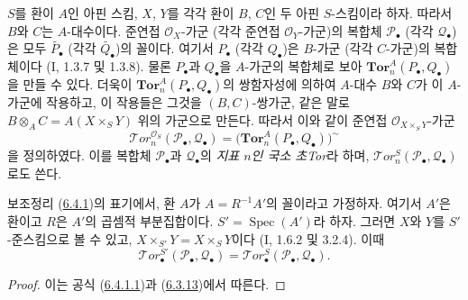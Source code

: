 \begin{env}[6.4.1]
\label{III.6.4.1-fr}
$S$를 환이 $A$인 아핀 스킴, $X$, $Y$를 각각 환이 $B$, $C$인 두
아핀 $S$-스킴이라 하자. 따라서 $B$와 $C$는 $A$-대수이다. 준연접
$\mathscr O_X$-가군 (각각 준연접 $\mathscr O_Y$-가군)의 복합체
$\mathscr P_\bullet$ (각각 $\mathscr Q_\bullet$)은 모두
$\widetilde{P_\bullet}$ (각각 $\widetilde{Q_\bullet}$)의 꼴이다. 여기서
$P_\bullet$ (각각 $Q_\bullet$)은 $B$-가군 (각각 $C$-가군)의 복합체이다
(I, 1.3.7 및 1.3.8). 물론 $P_\bullet$과 $Q_\bullet$을 $A$-가군의
복합체로 보아 $\mathbf{Tor}_n^A(P_\bullet,Q_\bullet)$을 만들 수 있다.
더욱이 $\mathbf{Tor}_n^A(P_\bullet,Q_\bullet)$의 쌍함자성에 의하여
$A$-대수 $B$와 $C$가 이 $A$-가군에 작용하고, 이 작용들은 그것을
$(B,C)$-쌍가군, 같은 말로 $B\otimes_A C=A(X\times_S Y)$ 위의 가군으로
만든다. 따라서 이와 같이 준연접 $\mathscr O_{X\times_S Y}$-가군
\[
  \mathscr{T}\!or_n^{\mathscr O_S}(\mathscr P_\bullet,\mathscr Q_\bullet)
  =\bigl(\mathbf{Tor}_n^A(P_\bullet,Q_\bullet)\bigr)^{\sim}
  \tag{6.4.1.1}\label{III.6.4.1.1.fr}
\]
을 정의하였다. 이를 복합체 $\mathscr P_\bullet$과
$\mathscr Q_\bullet$의 \emph{지표 $n$인 국소 초Tor}라 하며,
$\mathscr{T}\!or_n^S(\mathscr P_\bullet,\mathscr Q_\bullet)$로도 쓴다.
\end{env}

\begin{namedtheorem}[6.4.2]{보조정리}
\label{III.6.4.2-fr}
(\hyperref[III.6.4.1-fr]{6.4.1})의 표기에서, 환 $A$가
$A=R^{-1}A'$의 꼴이라고 가정하자. 여기서 $A'$은 환이고 $R$은
$A'$의 곱셈적 부분집합이다. $S'=\operatorname{Spec}(A')$라 하자.
그러면 $X$와 $Y$를 $S'$-준스킴으로 볼 수 있고,
$X\times_{S'}Y=X\times_S Y$이다 (I, 1.6.2 및 3.2.4). 이때
\[
  \mathscr{T}\!or_\bullet^{S'}(\mathscr P_\bullet,\mathscr Q_\bullet)
  =\mathscr{T}\!or_\bullet^S(\mathscr P_\bullet,\mathscr Q_\bullet).
\]
\end{namedtheorem}

\begin{proof}
이는 공식 (\hyperref[III.6.4.1.1.fr]{6.4.1.1})과
(\hyperref[III.6.3.13-fr]{6.3.13})에서 따른다.
\end{proof}

